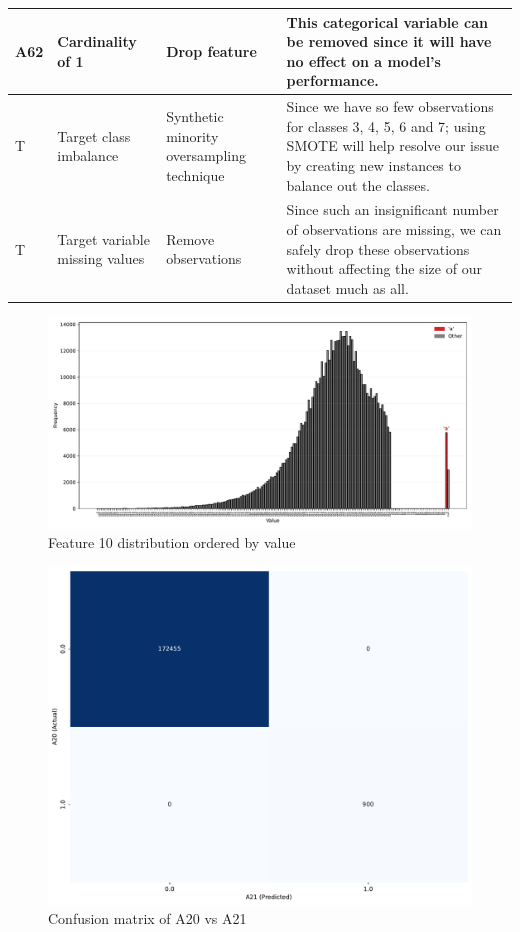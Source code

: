 \documentclass[11pt]{article}
\begin{document}
\begin{longtable}{|p{1.7cm}|p{4cm}|p{3cm}|p{6cm}|}
	A62 & Cardinality of 1 & Drop feature & This categorical variable can be removed since it will have no effect on a model's performance. \\ \hline
	T & Target class imbalance & Synthetic minority oversampling technique & Since we have so few observations for classes 3, 4, 5, 6 and 7; using SMOTE will help resolve our issue by creating new instances to balance out the classes.  \\ \hline
	T & Target variable missing values & Remove observations & Since such an insignificant number of observations are missing, we can safely drop these observations without affecting the size of our dataset much as all. \\ \hline
\end{longtable}

\begin{figure}
		\begin{minipage}[t]{\textwidth}
		\centering
		\includegraphics[width=\textwidth]{images/10_distribution.pdf}
		\caption{Feature 10 distribution ordered by value}
		\label{fig:f10}
	\end{minipage}
\end{figure}

\begin{figure}
	\begin{minipage}[t]{\textwidth}
		\centering
		\includegraphics[width=\textwidth]{images/confusion_matrix_A20_A21.pdf}
		\caption{Confusion matrix of A20 vs A21}
		\label{fig:a20a21}
	\end{minipage}
\end{figure}


%
%
\end{document}
